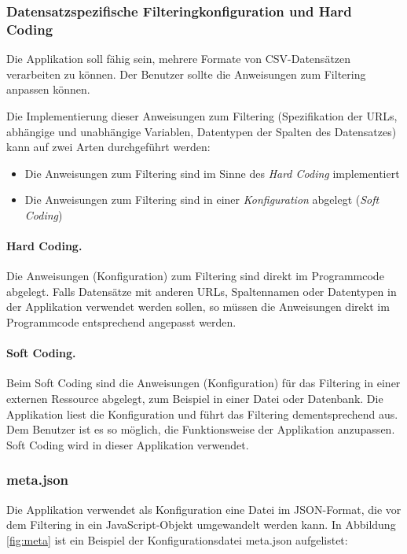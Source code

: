 \subsubsection*{Datensatzspezifische Filteringkonfiguration und Hard Coding}

Die Applikation soll fähig sein, mehrere Formate von CSV-Datensätzen verarbeiten zu können. Der Benutzer sollte die Anweisungen zum Filtering anpassen können.

Die Implementierung dieser Anweisungen zum Filtering (Spezifikation der URLs, abhängige und unabhängige Variablen, Datentypen der Spalten des Datensatzes) kann auf zwei Arten durchgeführt werden:

\begin{itemize}
	\item Die Anweisungen zum Filtering sind im Sinne des \textit{Hard Coding} implementiert
	\item Die Anweisungen zum Filtering sind in einer \textit{Konfiguration} abgelegt (\textit{Soft Coding})
\end{itemize}

\paragraph{Hard Coding.} Die Anweisungen (Konfiguration) zum Filtering sind direkt im Programmcode abgelegt. Falls Datensätze mit anderen URLs, Spaltennamen oder Datentypen in der Applikation verwendet werden sollen, so müssen die Anweisungen direkt im Programmcode entsprechend angepasst werden.

\paragraph{Soft Coding.} Beim Soft Coding sind die Anweisungen (Konfiguration) für das Filtering in einer externen Ressource abgelegt, zum Beispiel in einer Datei oder Datenbank. Die Applikation liest die Konfiguration und führt das Filtering dementsprechend aus. Dem Benutzer ist es so möglich, die Funktionsweise der Applikation anzupassen. Soft Coding wird in dieser Applikation verwendet.

\subsubsection*{meta.json}

Die Applikation verwendet als Konfiguration eine Datei im JSON-Format, die vor dem Filtering in ein JavaScript-Objekt umgewandelt werden kann. In Abbildung \ref{fig:meta} ist ein Beispiel der Konfigurationsdatei meta.json aufgelistet:

